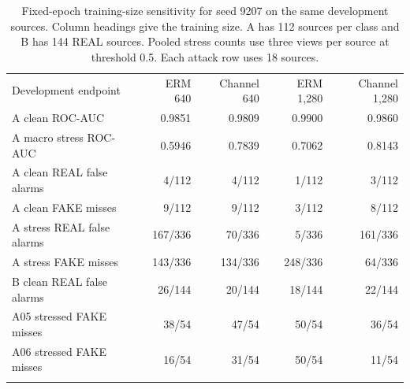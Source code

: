 \begin{table}[t]
\centering
\small
\caption{Fixed-epoch training-size sensitivity for seed 9207 on the same development sources. Column headings give the training size. A has 112 sources per class and B has 144 REAL sources. Pooled stress counts use three views per source at threshold 0.5. Each attack row uses 18 sources.}\label{tab:size-sensitivity}
\begin{tabular}{@{}lrrrr@{}}
\toprule
Development endpoint & ERM 640 & Channel 640 & ERM 1,280 & Channel 1,280 \\
\colrule
A clean ROC-AUC & 0.9851 & 0.9809 & 0.9900 & 0.9860 \\
A macro stress ROC-AUC & 0.5946 & 0.7839 & 0.7062 & 0.8143 \\
A clean REAL false alarms & 4/112 & 4/112 & 1/112 & 3/112 \\
A clean FAKE misses & 9/112 & 9/112 & 3/112 & 8/112 \\
A stress REAL false alarms & 167/336 & 70/336 & 5/336 & 161/336 \\
A stress FAKE misses & 143/336 & 134/336 & 248/336 & 64/336 \\
B clean REAL false alarms & 26/144 & 20/144 & 18/144 & 22/144 \\
A05 stressed FAKE misses & 38/54 & 47/54 & 50/54 & 36/54 \\
A06 stressed FAKE misses & 16/54 & 31/54 & 50/54 & 11/54 \\
\botrule
\end{tabular}
\end{table}
